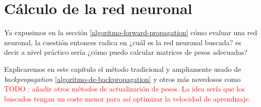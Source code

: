 %
%

\chapter{Cálculo de la red neuronal}

Ya expusimos en la sección \ref{algoritmo-forward-propagation} cómo evaluar
una red neuronal, la cuestión entonces radica en ¿cuál es la red neuronal
buscada? es decir a nivel práctico sería ¿cómo puedo calcular matrices de pesos 
adecuadas?

Explicaremos en este capítulo el método tradicional y ampliamente usado de 
\textit{backpropagation} \ref{algoritmo-de-backpropagation} y otros más novedosos como
\textcolor{red}{TODO : añadir otros métodos de actualización de pesos. La idea sería que 
los buscados tengan un coste menor para así optimizar la velocidad de aprendizaje.}

